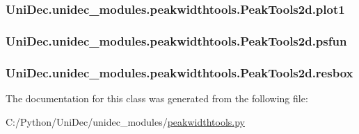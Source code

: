 \subsubsection[{plot1}]{\setlength{\rightskip}{0pt plus 5cm}Uni\+Dec.\+unidec\+\_\+modules.\+peakwidthtools.\+Peak\+Tools2d.\+plot1}\label{class_uni_dec_1_1unidec__modules_1_1peakwidthtools_1_1_peak_tools2d_a5165f79ff3ed30fb5359d55b09866f79}
\hypertarget{class_uni_dec_1_1unidec__modules_1_1peakwidthtools_1_1_peak_tools2d_a5cd7f3c11c2444a799f0823918eb6aed}{}
\subsubsection[{psfun}]{\setlength{\rightskip}{0pt plus 5cm}Uni\+Dec.\+unidec\+\_\+modules.\+peakwidthtools.\+Peak\+Tools2d.\+psfun}\label{class_uni_dec_1_1unidec__modules_1_1peakwidthtools_1_1_peak_tools2d_a5cd7f3c11c2444a799f0823918eb6aed}
\hypertarget{class_uni_dec_1_1unidec__modules_1_1peakwidthtools_1_1_peak_tools2d_a236ed9a7b69887e85e016053af0f0e6f}{}
\subsubsection[{resbox}]{\setlength{\rightskip}{0pt plus 5cm}Uni\+Dec.\+unidec\+\_\+modules.\+peakwidthtools.\+Peak\+Tools2d.\+resbox}\label{class_uni_dec_1_1unidec__modules_1_1peakwidthtools_1_1_peak_tools2d_a236ed9a7b69887e85e016053af0f0e6f}


The documentation for this class was generated from the following file\+:\begin{DoxyCompactItemize}
\item 
C\+:/\+Python/\+Uni\+Dec/unidec\+\_\+modules/\hyperlink{peakwidthtools_8py}{peakwidthtools.\+py}\end{DoxyCompactItemize}
